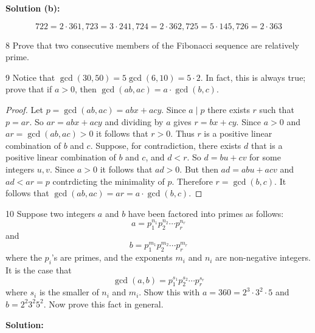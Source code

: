\textbf{Solution (b):}

\[722 = 2 \cdot 361, 723 = 3 \cdot 241, 724 = 2 \cdot 362, 725 = 5 \cdot 145, 726 = 2 \cdot 363\]

\begin{problem}{8}
    Prove that two consecutive members of the Fibonacci sequence are relatively prime.
\end{problem}
\unsolved

\begin{problem}{9}
    Notice that $\gcd(30, 50) = 5\gcd(6, 10) = 5 \cdot 2$. In fact, this is 
    always true; prove that if $a > 0$, then $\gcd(ab, ac) = a \cdot \gcd(b, c)$.
\end{problem}
\solved

\begin{proof}
    Let $p = \gcd(ab, ac) = abx + acy$. Since $a \mid p$ there exists $r$ such that $p = ar$.
    So $ar = abx + acy$ and dividing by $a$ gives $r = bx + cy$. 
    Since $a > 0$
        and $ar = \gcd (ab,ac) > 0$ it follows that $r > 0$. 
    Thus $r$ is a positive linear combination of $b$ and $c$.
    Suppose, for contradiction, there exists $d$ that is a positive linear combination of $b$ and $c$, and $d < r$.
    So $d = bu + cv$ for some integers $u, v$.
    Since $a > 0$ it follows that $ad > 0$.
    But then $ad = abu + acv$ and $ad < ar = p$ contrdicting the minimality of $p$.
    Therefore $r = \gcd(b, c)$.
    It follows that $\gcd(ab, ac) = ar =  a \cdot \gcd(b, c)$.
\end{proof}

\begin{problem}{10}
    Suppose two integers $a$ and $b$ have been factored into primes as follows:
    \[a = p_1^{n_1} p_2^{n_2} \cdots p_r^{n_r}\]
    and 
     \[b = p_1^{m_1} p_2^{m_2} \cdots p_r^{m_r}\]
    where the $p_i$'s are primes, and the exponents $m_i$ and $n_i$ are non-negative 
    integers. It is the case that 
    \[\gcd(a, b) = p_1^{s_1} p_2^{s_2} \cdots p_r^{s_r}\]
    where $s_i$ is the smaller of $n_i$ and $m_i$. Show this with $a = 360 = 2^3 \cdot 3^2 \cdot 5$
    and $b = 2^2 3^2 5^2$. Now prove this fact in general.
\end{problem}
\solved

\textbf{Solution:}

